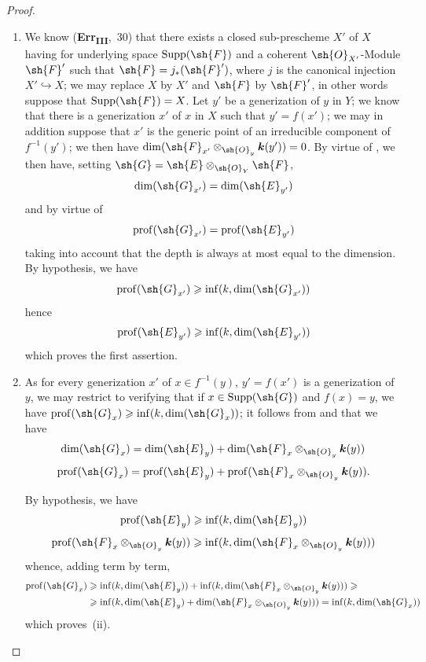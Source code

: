 \begin{proof}
\medskip\noindent
\begin{enumerate}[label=(\roman*)]
  \item We know (\textbf{Err}\textsubscript{\textbf{III}},~30) that there exists a closed sub-prescheme $X'$ of $X$ having for underlying space $\operatorname{Supp}(\sh{F})$ and a coherent $\sh{O}_{X'}$-Module $\sh{F}'$ such that $\sh{F}=j_*(\sh{F}')$, where $j$ is the canonical injection $X'\hookrightarrow X$; we may replace $X$ by $X'$ and $\sh{F}$ by $\sh{F}'$, in other words suppose that $\operatorname{Supp}(\sh{F})=X$.
Let $y'$ be a generization of $y$ in $Y$; we know  that there is a generization $x'$ of $x$ in $X$ such that $y'=f(x')$; we may in addition suppose that $x'$ is the generic point of an irreducible component of $f^{-1}(y')$; we then have $\dim(\sh{F}_{x'}\otimes_{\sh{O}_y}\boldsymbol{k}(y'))=0$.
By virtue of , we then have, setting $\sh{G}=\sh{E}\otimes_{\sh{O}_Y}\sh{F}$,
\[
  \dim(\sh{G}_{x'})=\dim(\sh{E}_{y'})
\]
and by virtue of 
\[
  \operatorname{prof}(\sh{G}_{x'})=\operatorname{prof}(\sh{E}_{y'})
\]
taking into account that the depth is always at most equal to the dimension.
By hypothesis, we have
\[
  \operatorname{prof}(\sh{G}_{x'})\geqslant\inf(k,\dim(\sh{G}_{x'}))
\]
hence
\[
  \operatorname{prof}(\sh{E}_{y'})\geqslant\inf(k,\dim(\sh{E}_{y'}))
\]
which proves the first assertion.

  \item As for every generization $x'$ of $x\in f^{-1}(y)$, $y'=f(x')$ is a generization of $y$, we may restrict to verifying that if $x\in\operatorname{Supp}(\sh{G})$ and $f(x)=y$, we have $\operatorname{prof}(\sh{G}_x)\geqslant\inf(k,\dim(\sh{G}_x))$; it follows from  and  that we have
\[
  \dim(\sh{G}_x)=\dim(\sh{E}_y)+\dim(\sh{F}_x\otimes_{\sh{O}_y}\boldsymbol{k}(y))
\]
\[
  \operatorname{prof}(\sh{G}_x)=\operatorname{prof}(\sh{E}_y)+\operatorname{prof}(\sh{F}_x\otimes_{\sh{O}_y}\boldsymbol{k}(y)).
\]

By hypothesis, we have
\[
  \operatorname{prof}(\sh{E}_y)\geqslant\inf(k,\dim(\sh{E}_y))
\]
\[
  \operatorname{prof}(\sh{F}_x\otimes_{\sh{O}_y}\boldsymbol{k}(y))\geqslant\inf(k,\dim(\sh{F}_x\otimes_{\sh{O}_y}\boldsymbol{k}(y)))
\]
whence, adding term by term,
\begin{align*}
  \operatorname{prof}(\sh{G}_x)&\geqslant\inf(k,\dim(\sh{E}_y))+\inf(k,\dim(\sh{F}_x\otimes_{\sh{O}_y}\boldsymbol{k}(y)))\geqslant{}\\
  &\geqslant\inf(k,\dim(\sh{E}_y)+\dim(\sh{F}_x\otimes_{\sh{O}_y}\boldsymbol{k}(y)))=\inf(k,\dim(\sh{G}_x))
\end{align*}
which proves~(ii).
\end{enumerate}
\end{proof}

